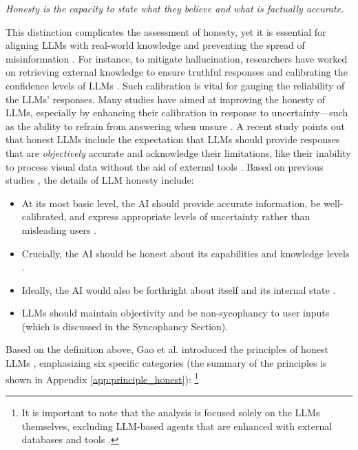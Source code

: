 \begin{tcolorbox}[definition]
\textit{Honesty is the capacity to state what they believe and what is factually accurate.}
\end{tcolorbox}

This distinction complicates the assessment of honesty, yet it is essential for aligning LLMs with real-world knowledge and preventing the spread of misinformation \cite{park2023ai}. For instance, to mitigate hallucination, researchers have worked on retrieving external knowledge to ensure truthful responses and calibrating the confidence levels of LLMs \cite{qin2023toolllm, Tang_Deng_Lin_Han_Liang_Sun_2023, yang2024gpt4tools, rtuning2024}. Such calibration is vital for gauging the reliability of the LLMs' responses. Many studies have aimed at improving the honesty of LLMs, especially by enhancing their calibration in response to uncertainty—such as the ability to refrain from answering when unsure \cite{yang2023alignment, cheng2024ai}. A recent study points out that honest LLMs include the expectation that LLMs should provide responses that are \emph{objectively} accurate and acknowledge their limitations, like their inability to process visual data without the aid of external tools \cite{metatool}. Based on previous studies \cite{gao2024best, yang2023alignment, askell2021general}, the details of LLM honesty include:

\begin{tcolorbox}[details]
\begin{itemize}[nolistsep, leftmargin=*]
    \item At its most basic level, the AI should provide accurate information, be well-calibrated, and express appropriate levels of uncertainty rather than misleading users \cite{yang2023alignment}.
    \item Crucially, the AI should be honest about its capabilities and knowledge levels \cite{metatool}.
    \item Ideally, the AI would also be forthright about itself and its internal state \cite{li2024think}.
    \item LLMs should maintain objectivity and be non-sycophancy to user inputs \cite{xu2023earth} (which is discussed in the Syncophancy Section).
\end{itemize}
\end{tcolorbox}

Based on the definition above, Gao et al. introduced the principles of honest LLMs \cite{gao2024best}, emphasizing six specific categories (the summary of the principles is shown in Appendix \ref{app:principle_honest}): \footnote{It is important to note that the analysis is focused solely on the LLMs themselves, excluding LLM-based agents that are enhanced with external databases and tools \citep{agentbench}.}


